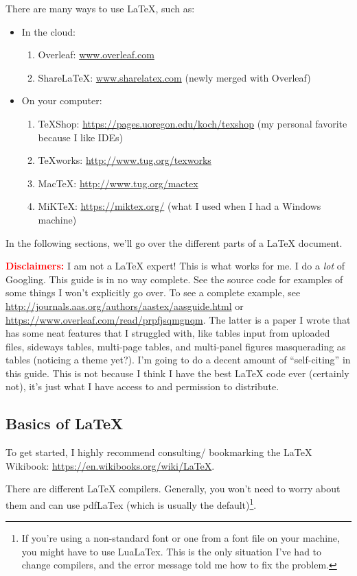 \documentclass[onecolumn,12pt]{aastex62}
\begin{document}
There are many ways to use LaTeX, such as:
\begin{itemize}
\itemsep0em 
\item In the cloud:
	\begin{enumerate}
	\item Overleaf: \url{www.overleaf.com}
	\item ShareLaTeX: \url{www.sharelatex.com} (newly merged with Overleaf)
	\end{enumerate}
\item On your computer:
	\begin{enumerate}
	\item TeXShop: \url{https://pages.uoregon.edu/koch/texshop} (my personal favorite because I like IDEs)
    \item TeXworks: \url{http://www.tug.org/texworks}
    \item MacTeX: \url{http://www.tug.org/mactex}
    \item MiKTeX: \url{https://miktex.org/} (what I used when I had a Windows machine)
    \end{enumerate}
\end{itemize}

In the following sections, we'll go over the different parts of a LaTeX document.

\textcolor{red}{\textbf{Disclaimers:}} I am not a LaTeX expert! This is what works for me. I do a \textit{lot} of Googling. This guide is in no way complete. See the source code for examples of some things I won't explicitly go over. To see a complete example, see \url{http://journals.aas.org/authors/aastex/aasguide.html} or \url{https://www.overleaf.com/read/prpfjsqmgnqm}. The latter is a paper I wrote that has some neat features that I struggled with, like tables input from uploaded files, sideways tables, multi-page tables, and multi-panel figures masquerading as tables (noticing a theme yet?). I'm going to do a decent amount of ``self-citing'' in this guide. This is not because I think I have the best LaTeX code ever (certainly not), it's just what I have access to and permission to distribute.

\subsection{Basics of LaTeX}
\label{ssec:latexbasics}
To get started, I highly recommend consulting/ bookmarking the LaTeX Wikibook: \url{https://en.wikibooks.org/wiki/LaTeX}. 

There are different LaTeX compilers. Generally, you won't need to worry about them and can use pdfLaTex (which is usually the default)\footnote{If you're using a non-standard font or one from a font file on your machine, you might have to use LuaLaTex. This is the only situation I've had to change compilers, and the error message told me how to fix the problem.}. 
\end{document}
